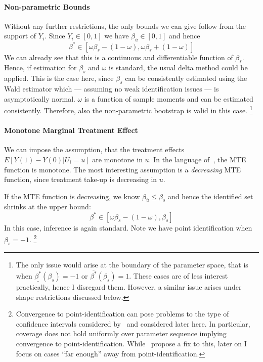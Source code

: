 \documentclass[12pt,a4paper,english]{article} %
\numberwithin{equation}{section}
\numberwithin{figure}{section}
\numberwithin{table}{section}
\begin{document}
\paragraph{Non-parametric Bounds}
Without any further restrictions, the only bounds we can give follow from the support of $Y_i$.
Since $Y_i\in[0,1]$ we have $\beta_{\overline{u}} \in [0,1]$ and hence
\begin{equation*}
  \beta^* \in [\omega\beta_s - (1 - \omega), \omega\beta_s + (1 - \omega)]
\end{equation*}
We can already see that this is a continuous and differentiable function of $\beta_s$.
Hence, if estimation for $\beta_s$ and $\omega$ is standard, the usual delta method could be applied.
This is the case here, since $\beta_s$ can be consistently estimated using the Wald estimator which --- assuming no weak identification issues --- is asymptotically normal.
$\omega$ is a function of sample moments and can be estimated consistently.
Therefore, also the non-parametric bootstrap is valid in this case.
\footnote{The only issue would arise at the boundary of the parameter space, that is when $\underline{\beta^*}(\beta_s)=-1$ or $\overline{\beta^*}(\beta_s)=1$.
These cases are of less interest practically, hence I disregard them. However, a similar issue arises under shape restrictions discussed below.}

\paragraph{Monotone Marginal Treatment Effect}
We can impose the assumption, that the treatment effects $E[Y(1) - Y(0)|U_i=u]$ are monotone in $u$.
In the language of~\cite{mogstad2018using}, the MTE function is monotone.
The most interesting assumption is a \textit{decreasing} MTE function, since treatment take-up is decreasing in $u$.

If the MTE function is decreasing, we know $\beta_{\overline{u}} \leq \beta_s$ and hence the identified set shrinks at the upper bound:
\begin{equation*}
  \beta^* \in [\omega\beta_s - (1 - \omega), \beta_s]
\end{equation*}
In this case, inference is again standard. Note we have point identification when $\beta_s=-1$.
\footnote{Convergence to point-identification can pose problems to the type of confidence intervals considered by~\cite{imbens2004confidence} and considered later here.
In particular, coverage does not hold uniformly over parameter sequence implying convergence to point-identification.
While~\cite{imbens2004confidence} propose a fix to this, later on I focus on cases ``far enough'' away from point-identification.}
\end{document}
